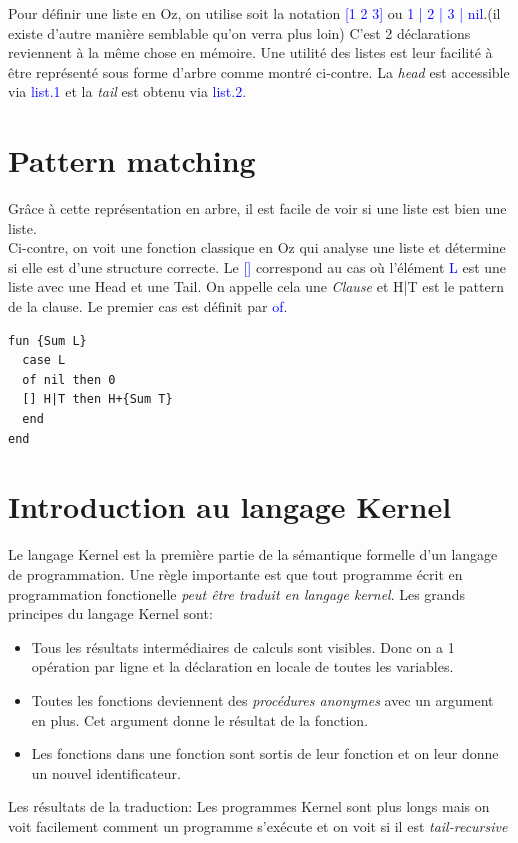 \documentclass{report}
\begin{document}
Pour définir une liste en Oz, on utilise soit la notation \textcolor{blue}{[1 2 3]} ou \textcolor{blue}{1 | 2 | 3 | nil}.(il existe d'autre manière semblable qu'on verra plus loin) C'est 2 déclarations reviennent à la même chose en mémoire. Une utilité des listes est leur facilité à être représenté sous forme d'arbre comme montré ci-contre. La \textit{head} est accessible via \textcolor{blue}{list.1} et la \textit{tail} est obtenu via \textcolor{blue}{list.2}.

\section{Pattern matching}

Grâce à cette représentation en arbre, il est facile de voir si une liste est bien une liste.\\
Ci-contre, on voit une fonction classique en Oz qui analyse une liste et détermine si elle est d'une structure correcte. Le \textcolor{blue}{[]} correspond au cas où l'élément \textcolor{blue}{L} est une liste avec une Head et une Tail. On appelle cela une \textit{Clause} et H|T est le pattern de la clause. Le premier cas est définit par \textcolor{blue}{of}.
\begin{lstlisting}[escapechar=\%]
fun {Sum L}
  case L
  of nil then 0
  [] H|T then H+{Sum T}
  end
end
\end{lstlisting}
\newpage

\section{Introduction au langage Kernel}
Le langage Kernel est la première partie de la sémantique formelle d'un langage de programmation. Une règle importante est que tout programme écrit en programmation fonctionelle \textit{peut être traduit en langage kernel}.
Les grands principes du langage Kernel sont:
\begin{itemize}
	\item Tous les résultats intermédiaires de calculs sont visibles. Donc on a 1 opération par ligne et la déclaration en locale de toutes les variables.
	\item Toutes les fonctions deviennent des \textit{procédures anonymes} avec un argument en plus. Cet argument donne le résultat de la fonction.
	\item Les fonctions dans une fonction sont sortis de leur fonction et on leur donne un nouvel identificateur.
\end{itemize}
Les résultats de la traduction: Les programmes Kernel sont plus longs mais on voit facilement comment un programme s'exécute et on voit si il est \textit{tail-recursive}
\end{document}
